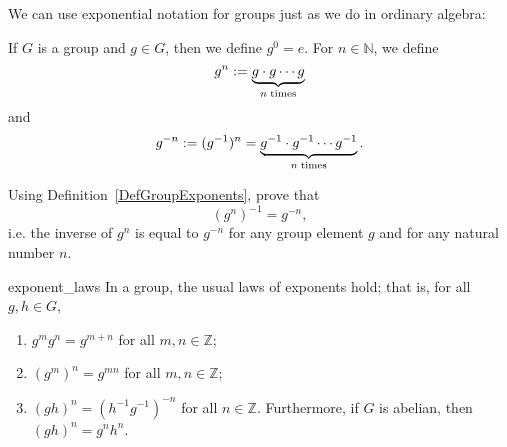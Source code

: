 We can use exponential notation for groups just as we do in ordinary
algebra:

\begin{defn}\label{DefGroupExponents}
 If $G$ is a group and $g \in G$, then we define $g^0 = e$.
For $n \in {\mathbb N}$, we define 
\[
g^n := \underbrace{g \cdot g \cdots g}_{n \; {\rm times}}
\]
and
\[
g^{-n} := (g^{-1})^n =  \underbrace{g^{-1} \cdot g^{-1} \cdots g^{-1}}_{n \; {\rm times}}. \]
 \end{defn}
 
\begin{exercise}{57}
Using Definition~\ref{DefGroupExponents}, prove that 
\[ (g^n)^{-1} = g^{-n},\]
i.e. the inverse of $g^n$ is equal to $g^{-n}$ for any group element $g$ and for any natural number $n$.
\end{exercise}

\begin{prop}{exponent_laws} 
In a group, the usual laws of exponents hold; that is, for all $g, h \in G$,
\begin{enumerate}
 
\item
$g^mg^n = g^{m+n}$ for all $m, n \in {\mathbb Z}$; 
 
\item
$(g^m)^n = g^{mn}$ for all $m, n \in {\mathbb Z}$; 
 
\item
$(gh)^n = (h^{-1}g^{-1})^{-n}$ for all $n \in {\mathbb Z}$. Furthermore,
if $G$ is abelian, then $(gh)^n = g^nh^n$. 
 
\end{enumerate}
\end{prop}
 
